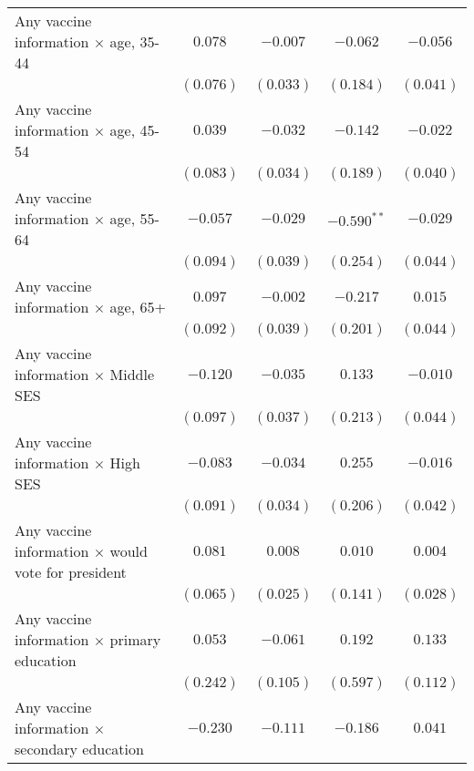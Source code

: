 \begin{table}
\begin{center}
\begin{tabular}{l c c c c}
Any vaccine information $\times$ age, 35-44               & $0.078$     & $-0.007$    & $-0.062$      & $-0.056$  \\
                                                          & $(0.076)$   & $(0.033)$   & $(0.184)$     & $(0.041)$ \\
Any vaccine information $\times$ age, 45-54               & $0.039$     & $-0.032$    & $-0.142$      & $-0.022$  \\
                                                          & $(0.083)$   & $(0.034)$   & $(0.189)$     & $(0.040)$ \\
Any vaccine information $\times$ age, 55-64               & $-0.057$    & $-0.029$    & $-0.590^{**}$ & $-0.029$  \\
                                                          & $(0.094)$   & $(0.039)$   & $(0.254)$     & $(0.044)$ \\
Any vaccine information $\times$ age, 65+                 & $0.097$     & $-0.002$    & $-0.217$      & $0.015$   \\
                                                          & $(0.092)$   & $(0.039)$   & $(0.201)$     & $(0.044)$ \\
Any vaccine information $\times$ Middle SES               & $-0.120$    & $-0.035$    & $0.133$       & $-0.010$  \\
                                                          & $(0.097)$   & $(0.037)$   & $(0.213)$     & $(0.044)$ \\
Any vaccine information $\times$ High SES                 & $-0.083$    & $-0.034$    & $0.255$       & $-0.016$  \\
                                                          & $(0.091)$   & $(0.034)$   & $(0.206)$     & $(0.042)$ \\
Any vaccine information $\times$ would vote for president & $0.081$     & $0.008$     & $0.010$       & $0.004$   \\
                                                          & $(0.065)$   & $(0.025)$   & $(0.141)$     & $(0.028)$ \\
Any vaccine information $\times$ primary education        & $0.053$     & $-0.061$    & $0.192$       & $0.133$   \\
                                                          & $(0.242)$   & $(0.105)$   & $(0.597)$     & $(0.112)$ \\
Any vaccine information $\times$ secondary education      & $-0.230$    & $-0.111$    & $-0.186$      & $0.041$   \\

\end{tabular}
\end{center}
\end{table}
